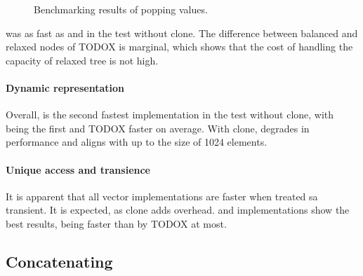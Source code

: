 \begin{figure}[!htbp]
    \caption{Benchmarking results of popping values.}
    \label{fig:pop}
\end{figure}

\imrsvec{} was as fast as \rbvec{} and \rrbvec{} in the test without clone. The difference between balanced and relaxed nodes of TODOX is marginal, which shows that the cost of handling the capacity of relaxed tree is not high. 

\paragraph{Dynamic representation}
Overall, \pvec{} is the second fastest implementation in the test without clone, with \stdvec{} being the first and TODOX faster on average. With clone, \pvec{} degrades in performance and aligns with \stdvec{} up to the size of 1024 elements. 

\paragraph{Unique access and transience}
It is apparent that all vector implementations are faster when treated sa transient. It is expected, as clone adds overhead. \rbvec{} and \rrbvec{} implementations show the best results, being faster than \stdvec{} by TODOX at most. 

\subsection{Concatenating}

